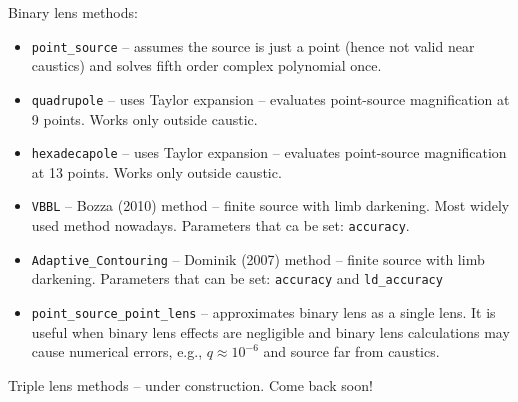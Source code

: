 \documentclass[12pt]{article}
\begin{document}
\bigskip\bigskip
Binary lens methods:
\begin{itemize}
\item {\tt point\_source} -- assumes the source is just a point (hence not valid near caustics) and solves fifth order complex polynomial once.
\item {\tt quadrupole} -- uses Taylor expansion -- evaluates point-source magnification at 9 points.  Works only outside caustic.
\item {\tt hexadecapole} -- uses Taylor expansion -- evaluates point-source magnification at 13 points.  Works only outside caustic.
\item {\tt VBBL} -- Bozza (2010) method -- finite source with limb darkening.  Most widely used method nowadays.  Parameters that ca be set: {\tt accuracy}.
\item {\tt Adaptive\_Contouring} -- Dominik (2007) method -- finite source with limb darkening.  Parameters that can be set: {\tt accuracy} and {\tt ld\_accuracy}
\item {\tt point\_source\_point\_lens} -- approximates binary lens as a single lens.  It is useful when binary lens effects are negligible and binary lens calculations 
may cause numerical errors, e.g., $q\approx10^{-6}$ and source far from caustics.  
\end{itemize}

\bigskip\bigskip
Triple lens methods -- under construction.  Come back soon!
\end{document}
